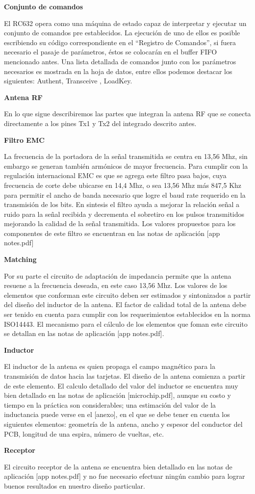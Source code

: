 {\bf{Conjunto de comandos}}

El RC632 opera como una máquina de estado capaz de interpretar y ejecutar un conjunto de comandos pre establecidos. La ejecución de uno de ellos es posible escribiendo su código correspondiente en el “Registro de Comandos”, si fuera necesario el pasaje de parámetros, éstos se colocarán en el buffer FIFO mencionado antes. 
Una lista detallada de comandos junto con los parámetros necesarios es mostrada en la hoja de datos, entre ellos podemos destacar los siguientes: Authent, Transceive , LoadKey.

{\bf{Antena RF}}

En lo que sigue describiremos las partes que integran la antena RF que se conecta directamente a los pines Tx1 y Tx2 del integrado descrito antes.

{\bf{Filtro EMC}}

La frecuencia de la portadora de la señal transmitida se centra en 13,56 Mhz, sin embargo se generan también armónicos de mayor frecuencia. Para cumplir con la regulación internacional EMC es que se agrega este filtro pasa bajos, cuya frecuencia de corte debe ubicarse en 14,4 Mhz, o sea 13,56 Mhz más 847,5 Khz para permitir el ancho de banda necesario que logre el baud rate requerido en la transmisión de los bits. 
En sintesis el filtro ayuda a mejorar la relación señal a ruido para la señal recibida y decrementa el sobretiro en los pulsos transmitidos mejorando la calidad de la señal transmitida.
Los valores propuestos para los componentes de este filtro se encuentran en las notas de aplicación [app notes.pdf]


{\bf{Matching}}

Por su parte el circuito de adaptación de impedancia permite que la antena resuene a la frecuencia deseada, en este caso 13,56 Mhz. Los valores de los elementos que conforman este circuito deben ser estimados y sintonizados a partir del diseño del inductor de la antena.
El factor de calidad total de la antena debe ser tenido en cuenta para cumplir con los requerimientos establecidos en la norma ISO14443. 
El mecanismo para el cálculo de los elementos que foman este circuito se detallan en las notas de aplicación [app notes.pdf].

{\bf{Inductor}}

El inductor de la antena es quien propaga el campo magnético para la transmisión de datos hacia las tarjetas. El diseño de la antena comienza a partir de este elemento.
El calculo detallado del valor del inductor se encuentra muy bien detallado en las notas de aplicación [microchip.pdf], aunque su costo y tiempo en la práctica son considerables; una estimación del valor de la inductancia puede verse en el [anexo], en el que se debe tener en cuenta los siguientes elementos: geometría de la antena, ancho y espesor del conductor del PCB, longitud de una espira, número de vueltas, etc.

{\bf{Receptor}} 

El circuito receptor de la antena se encuentra bien detallado en las notas de aplicación [app notes.pdf] y no fue necesario efectuar ningún cambio para lograr buenos resultados en nuestro diseño particular. 